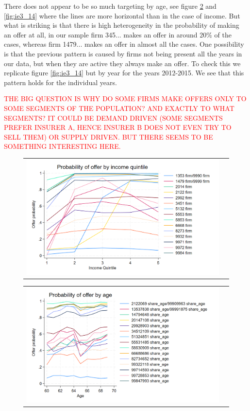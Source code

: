 \documentclass[12pt]{article}
\begin{document}
There does not appear to be so much targeting by age, see figure \ref{fig:ie3_13} and \ref{fig:ie3_14} where the lines are more horizontal than in the case of income. But what is striking is that there is high heterogeneity in the probability of making an offer at all, in our sample firm 345... makes an offer in around 20\% of the cases, whereas firm 1479... makes an offer in almost all the cases.
One possibility is that the previous pattern is caused by firms not being present all the years in our data, but when they are active they always make an offer. To check this we replicate figure \ref{fig:ie3_14} but by year for the years 2012-2015. We see that this pattern holds for the individual years. 


\textcolor{red}{THE BIG QUESTION IS WHY DO SOME FIRMS MAKE OFFERS ONLY TO SOME SEGMENTS OF THE POPULATION? AND EXACTLY TO WHAT SEGMENTS? IT COULD BE DEMAND DRIVEN (SOME SEGMENTS PREFER INSURER A, HENCE INSURER B DOES NOT EVEN TRY TO SELL THEM) OR SUPPLY DRIVEN. BUT THERE SEEMS TO BE SOMETHING INTERESTING HERE.}


\begin{figure}[H]
\caption{}
\label{fig:ie3_12}
\centering{}%
\begin{tabular}{cc}
\includegraphics[scale=0.27]{../figures/IE3_supply_offerprob_income_q.png}
\end{tabular}
\end{figure}


\begin{figure}[H]
\caption{}
\label{fig:ie3_13}
\centering{}%
\begin{tabular}{cc}
\includegraphics[scale=0.27]{../figures/IE3_supply_offerprob_age.png}
\end{tabular}
\end{figure}
\end{document}
